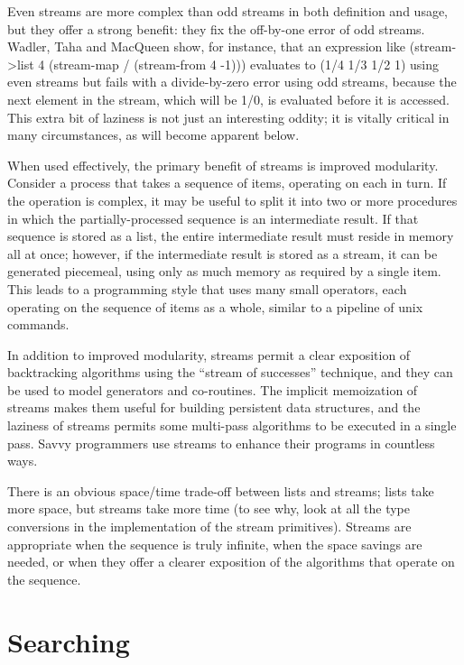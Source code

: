 \documentclass[a4paper]{article}
\begin{document}
Even streams are more complex than odd streams in both definition and usage, but they offer a strong benefit: they fix the off-by-one error of odd streams. Wadler, Taha and MacQueen show, for instance, that an expression like (stream->list 4 (stream-map / (stream-from 4 -1))) evaluates to (1/4 1/3 1/2 1) using even streams but fails with a divide-by-zero error using odd streams, because the next element in the stream, which will be 1/0, is evaluated before it is accessed. This extra bit of laziness is not just an interesting oddity; it is vitally critical in many circumstances, as will become apparent below.

When used effectively, the primary benefit of streams is improved modularity. Consider a process that takes a sequence of items, operating on each in turn. If the operation is complex, it may be useful to split it into two or more procedures in which the partially-processed sequence is an intermediate result. If that sequence is stored as a list, the entire intermediate result must reside in memory all at once; however, if the intermediate result is stored as a stream, it can be generated piecemeal, using only as much memory as required by a single item. This leads to a programming style that uses many small operators, each operating on the sequence of items as a whole, similar to a pipeline of unix commands.

In addition to improved modularity, streams permit a clear exposition of backtracking algorithms using the “stream of successes” technique, and they can be used to model generators and co-routines. The implicit memoization of streams makes them useful for building persistent data structures, and the laziness of streams permits some multi-pass algorithms to be executed in a single pass. Savvy programmers use streams to enhance their programs in countless ways.

There is an obvious space/time trade-off between lists and streams; lists take more space, but streams take more time (to see why, look at all the type conversions in the implementation of the stream primitives). Streams are appropriate when the sequence is truly infinite, when the space savings are needed, or when they offer a clearer exposition of the algorithms that operate on the sequence.
 

\section{Searching}
\end{document}
